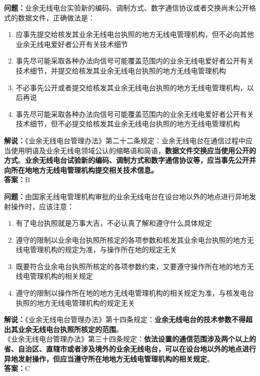 \documentclass{ctexbook}
\begin{document}
\noindent\textbf{问题：}业余无线电台实验新的编码、调制方式、数字通信协议或者交换尚未公开格式的数据文件，正确做法是：
\begin{enumerate}[label=\Alph*), leftmargin=3em]
	\item 应事先提交给核发其业余无线电台执照的地方无线电管理机构，但不必向其他业余无线电爱好者公开有关技术细节
	\item 事先尽可能采取各种办法向信号可能覆盖范围内的业余无线电爱好者公开有关技术细节，并提交给核发其业余无线电台执照的地方无线电管理机构
	\item 不必事先公开或者提交给核发其业余无线电台执照的地方无线电管理机构，以后再说
	\item 事先尽可能采取各种办法向信号可能覆盖范围内的业余无线电爱好者公开有关技术细节，但不必提交给核发其业余无线电台执照的地方无线电管理机构
\end{enumerate}
\noindent\textbf{解说：}《业余无线电台管理办法》第二十二条规定：业余无线电台在通信过程中应当使用明语及业余无线电领域公认的缩略语和简语，\textbf{数据文件交换应当使用公开的方式}。\textbf{业余无线电台试验新的编码、调制方式和数字通信协议等，应当事先公开并向所在地地方无线电管理机构提交相关技术信息。}\\\noindent\textbf{答案：}B



\bigskip


\noindent\textbf{问题：}由国家无线电管理机构审批的业余无线电台在设台地以外的地点进行异地发射操作时，应该注意：
\begin{enumerate}[label=\Alph*), leftmargin=3em]
	\item 有了电台执照就是万事大吉，不必认真了解和遵守什么具体规定
	\item 遵守的限制以业余电台执照所核定的各项参数和核发其业余电台执照的地方无线电管理机构的规定为准，与操作所在地的规定无关
	\item 既要符合业余电台执照所核定的各项参数约束，又要遵守操作所在地的地方无线电管理机构的相关规定
	\item 遵守的限制以操作所在地的地方无线电管理机构的相关规定为准，与核发电台执照的地方无线电管理机构的规定无关
\end{enumerate}
\noindent\textbf{解说：}《业余无线电台管理办法》第十四条规定：\textbf{业余无线电台的技术参数不得超出其业余无线电台执照所核定的范围}。\\
《业余无线电台管理办法》第三十四条规定：\textbf{依法设置的通信范围涉及两个以上的省、自治区、直辖市或者涉及境外的业余无线电台，可以在设台地以外的地点进行异地发射操作，但应当遵守所在地地方无线电管理机构的相关规定}。\\\noindent\textbf{答案：}C
\end{document}
